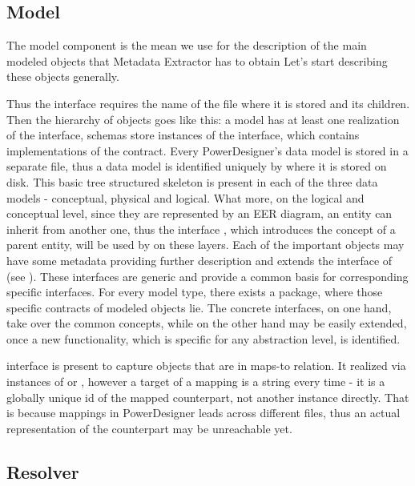 \subsection{Model}

The model component is the mean we use for the description of the main modeled objects that Metadata Extractor has to obtain
Let's start describing these objects generally.

Thus the  interface requires the name of the file where it is stored and its children.
Then the hierarchy of objects goes like this: a model has at least one realization of the  interface, schemas store instances of the  interface, which contains implementations of the  contract.
Every PowerDesigner's data model is stored in a separate file, thus a data model is identified uniquely by where it is stored on disk.
This basic tree structured skeleton is present in each of the three data models - conceptual, physical and logical. 
What more, on the logical and conceptual level, since they are represented by an EER diagram, an entity can inherit from another one, thus the interface , which introduces the concept of a parent entity, will be used by on these layers. 
Each of the important objects may have some metadata providing further description and extends the interface of  (see ).
These interfaces are generic and provide a common basis for corresponding specific interfaces.
For every model type, there exists a package, where those specific contracts of modeled objects lie. 
The concrete interfaces, on one hand, take over the common concepts, while on the other hand may be easily extended, once a new functionality, which is specific for any abstraction level, is identified.

 interface is present to capture objects that are in maps-to relation. It realized via instances of  or , however a target of a mapping is a string every time - it is a globally unique id of the mapped counterpart, not another instance directly. That is because mappings in PowerDesigner leads across different files, thus an actual representation of the counterpart may be unreachable yet.

\subsection{Resolver}

